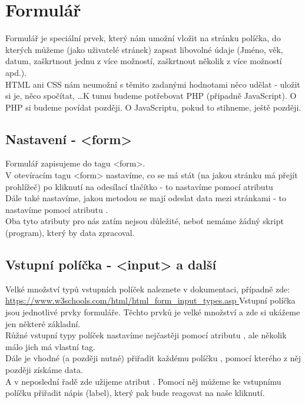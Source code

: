 \section{Formulář}
Formulář je speciální prvek, který nám umožní vložit na stránku políčka, do kterých můžeme (jako uživatelé stránek) zapsat libovolné údaje (Jméno, věk, datum, zaškrtnout jednu z více možností, zaškrtnout několik z více možností apd.).\\

\vspace{0.5cm}
HTML ani CSS nám neumožní s těmito zadanými hodnotami něco udělat - uložit si je, něco spočítat, \dots K tumu budeme potřebovat PHP (připadně JavaScript). O PHP si budeme povídat později. O JavaScriptu, pokud to stihneme, ještě později.\\

\subsection{Nastavení - <form>}
Formulář zapisujeme do tagu <form>.\\
V otevíracím tagu <form> nastavíme, co se má stát (na jakou stránku má přejít prohlížeč) po kliknutí na odesílací tlačítko - to nastavíme pomocí atributu \\
Dále také nastavíme, jakou metodou se mají odeslat data mezi stránkami - to nastavíme pomocí atributu .\\
Oba tyto atributy pro nás zatím nejsou důležité, neboť nemáme žádný skript (program), který by data zpracoval.

\subsection{Vstupní políčka - <input> a další}
Velké množství typů vstupních políček naleznete v dokumentaci, případně zde: \url{https://www.w3schools.com/html/html_form_input_types.asp	}
Vstupní políčka jsou jednotlivé prvky formuláře. Těchto prvků je velké množství a zde si ukážeme jen některé základní.\\
Růžné vstupní typy políček nastavíme nejčastěji pomocí atributu , ale několik málo jich má vlastní tag.\\
Dále je vhodné (a později nutné) přiřadit každému políčku , pomocí kterého z něj později získáme data.\\
A v neposlední řadě zde užijeme atribut . Pomocí něj můžeme ke vstupnímu políčku přiřadit nápis (label), který pak bude reagovat na naše kliknutí.

